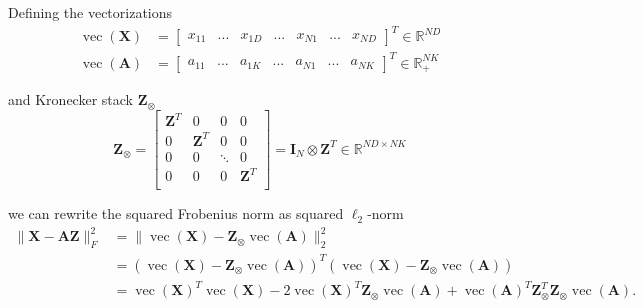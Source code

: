 \documentclass{article}
\begin{document}
Defining the vectorizations
\begin{equation}
    \begin{aligned}
        \operatorname{vec}(\mathbf{X}) &= \begin{bmatrix} x_{11} & ... & x_{1D} & ... & x_{N1} & ... & x_{ND} \end{bmatrix}^T \in \mathbb{R}^{ND} \\
        \operatorname{vec}(\mathbf{A}) &= \begin{bmatrix} a_{11} & ... & a_{1K} & ... & a_{N1} & ... & a_{NK} \end{bmatrix}^T \in \mathbb{R}_+^{NK}
    \end{aligned}
\end{equation}

and Kronecker stack $\mathbf{Z}_{\otimes}$
\begin{equation}
    \mathbf{Z}_{\otimes} =
        \begin{bmatrix}
            \mathbf{Z}^T & 0 & 0 & 0 \\
            0 & \mathbf{Z}^T & 0 & 0 \\
            0 & 0 & \ddots & 0 \\
            0 & 0 & 0 & \mathbf{Z}^T \\
        \end{bmatrix} = \mathbf{I}_N \otimes \mathbf{Z}^T \in \mathbb{R}^{ND \times NK}
\end{equation}

we can rewrite the squared Frobenius norm as squared $\ell_2$-norm\begin{equation}
    \begin{aligned}
        \| \mathbf{X} - \mathbf{A} \mathbf{Z} \|_F^2
        &= \bigl\|
            \operatorname{vec}(\mathbf{X}) - \mathbf{Z}_{\otimes} \operatorname{vec}(\mathbf{A})
        \bigr\|_2^{2} \\
        &= \left( \operatorname{vec}(\mathbf{X}) - \mathbf{Z}_{\otimes} \operatorname{vec}(\mathbf{A}) \right)^T
        \left( \operatorname{vec}(\mathbf{X}) - \mathbf{Z}_{\otimes} \operatorname{vec}(\mathbf{A}) \right) \\
        &=  \operatorname{vec}(\mathbf{X})^T  \operatorname{vec}(\mathbf{X})
        - 2 \operatorname{vec}(\mathbf{X})^T \mathbf{Z}_{\otimes} \operatorname{vec}(\mathbf{A})
        + \operatorname{vec}(\mathbf{A})^T \mathbf{Z}_{\otimes}^T \mathbf{Z}_{\otimes} \operatorname{vec}(\mathbf{A}).
    \end{aligned}
\end{equation}
\end{document}
